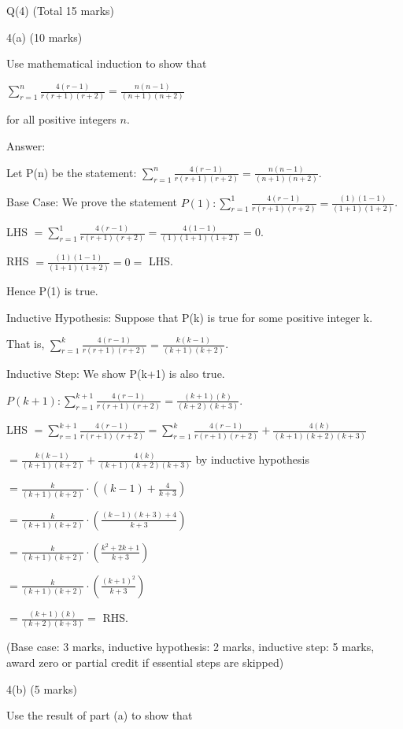 \documentclass[a4paper,12pt,oneside]{book}
\theoremstyle{definition}
\begin{document}
\newpage 

Q(4) (Total 15 marks)

4(a) (10 marks)

Use mathematical induction to show that

$\sum_{r=1}^n \frac{4(r-1)}{r(r+1)(r+2)} = \frac{n(n-1)}{(n+1)(n+2)}$

for all positive integers $n$.

Answer:

Let P(n) be the statement: $\sum_{r=1}^n \frac{4(r-1)}{r(r+1)(r+2)} = \frac{n(n-1)}{(n+1)(n+2)}$.

Base Case: We prove the statement $P(1) : \sum_{r=1}^1 \frac{4(r-1)}{r(r+1)(r+2)} = \frac{(1)(1-1)}{(1+1)(1+2)}$.

LHS $ =\sum_{r=1}^1 \frac{4(r-1)}{r(r+1)(r+2)} = \frac{4(1-1)}{(1)(1+1)(1+2)} = 0$.

RHS $ = \frac{(1)(1-1)}{(1+1)(1+2)} = 0 = $ LHS.

Hence P(1) is true.

Inductive Hypothesis: Suppose that P(k) is true for some positive integer k.

That is, $\sum_{r=1}^k \frac{4(r-1)}{r(r+1)(r+2)} = \frac{k(k-1)}{(k+1)(k+2)}$.

Inductive Step: We show P(k+1)  is also true.

$P(k+1) : \sum_{r=1}^{k+1} \frac{4(r-1)}{r(r+1)(r+2)} = \frac{(k+1)(k)}{(k+2)(k+3)}$.

LHS $ = \sum_{r=1}^{k+1} \frac{4(r-1)}{r(r+1)(r+2)}  = \sum_{r=1}^{k} \frac{4(r-1)}{r(r+1)(r+2)} + \frac{4(k)}{(k+1)(k+2)(k+3)}$

$= \frac{k(k-1)}{(k+1)(k+2)} + \frac{4(k)}{(k+1)(k+2)(k+3)}$ by inductive hypothesis

$= \frac{k}{(k+1)(k+2)} \cdot \left( (k-1) + \frac{4}{k+3} \right)$

$= \frac{k}{(k+1)(k+2)} \cdot \left( \frac{(k-1)(k+3)+4}{k+3} \right)$

$= \frac{k}{(k+1)(k+2)} \cdot \left( \frac{k^2+2k+1}{k+3} \right)$

$= \frac{k}{(k+1)(k+2)} \cdot \left( \frac{(k+1)^2}{k+3} \right)$

$= \frac{(k+1)(k)}{(k+2)(k+3)} = $ RHS.

(Base case: 3 marks, inductive hypothesis: 2 marks, inductive step: 5 marks, award zero or partial credit if essential steps are skipped)

4(b) (5 marks) 

Use the result of part (a) to show that
\end{document}
